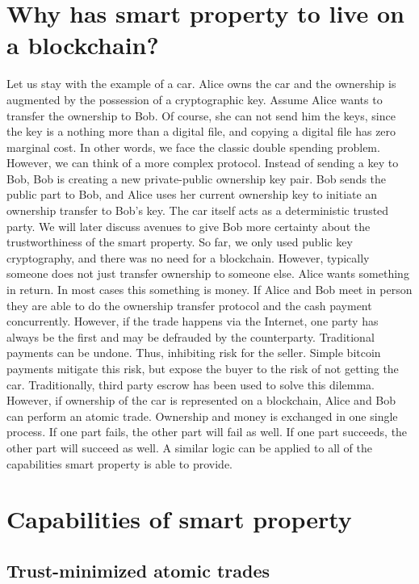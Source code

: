 \section{Why has smart property to live on a blockchain?}

Let us stay with the example of a car. Alice owns the car and the ownership is augmented by the possession of a cryptographic key. Assume Alice wants to transfer the ownership to Bob. Of course, she can not send him the keys, since the key is a nothing more than a digital file, and copying a digital file has zero marginal cost. In other words, we face the classic double spending problem. However, we can think of a more complex protocol. Instead of sending a key to Bob, Bob is creating a new private-public ownership key pair. Bob sends the public part to Bob, and Alice uses her current ownership key to initiate an ownership transfer to Bob's key. The car itself acts as a deterministic trusted party. We will later discuss avenues to give Bob more certainty about the trustworthiness of the smart property.
So far, we only used public key cryptography, and there was no need for a blockchain. However, typically someone does not just transfer ownership to someone else. Alice wants something in return. In most cases this something is money. If Alice and Bob meet in person they are able to do the ownership transfer protocol and the cash payment concurrently. However, if the trade happens via the Internet, one party has always be the first and may be defrauded by the counterparty. Traditional payments can be undone. Thus, inhibiting risk for the seller. Simple bitcoin payments mitigate this risk, but expose the buyer to the risk of not getting the car. Traditionally, third party escrow has been used to solve this dilemma.
However, if ownership of the car is represented on a blockchain, Alice and Bob can perform an atomic trade. Ownership and money is exchanged in one single process. If one part fails, the other part will fail as well. If one part succeeds, the other part will succeed as well. A similar logic can be applied to all of the capabilities smart property is able to provide.


\section{Capabilities of smart property}

\subsection{Trust-minimized atomic trades}

